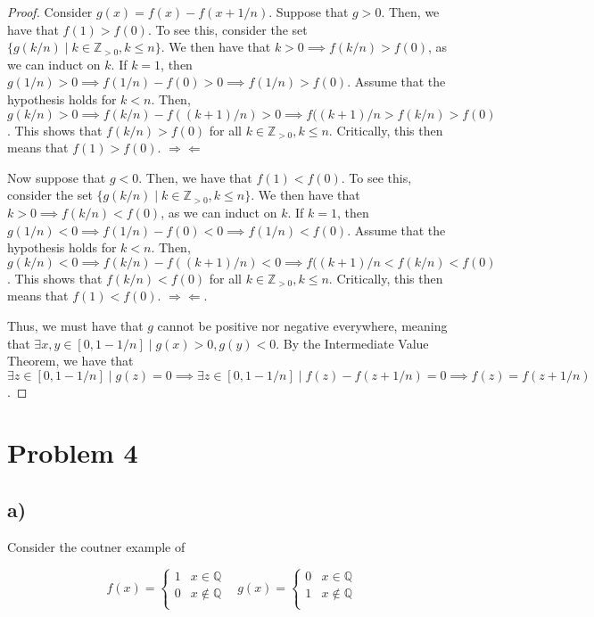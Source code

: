 \documentclass[12pt,letterpaper]{article}
\theoremstyle{definition}
\newcommand{\contra}{\Rightarrow\!\Leftarrow}
\newcommand{\Zg}{\mathbb{Z}_{>0}}
\newcommand{\Q}{\mathbb{Q}}
\begin{document}
\begin{proof}
  Consider $g(x) = f(x) - f(x + 1/n)$. Suppose that $g > 0$. Then, we have that
  $f(1) > f(0)$. To see this, consider the set $\{ g(k/n) \mid k \in \Zg, k \leq
  n\}.$ We then have that $k > 0 \implies f(k/n) > f(0)$, as we can induct on
  $k$. If $k = 1$, then $g(1/n) > 0 \implies f(1/n) - f(0) > 0 \implies f(1/n) >
  f(0)$. Assume that the hypothesis holds for $k < n$. Then, $g(k/n) > 0
  \implies f(k/n) - f((k+1)/n) > 0 \implies f((k+1)/n > f(k/n) > f(0)$. This
  shows that $f(k/n) > f(0)$ for all $k \in \Zg, k \leq n$. Critically, this
  then means that $f(1) > f(0)$. $\contra$

  Now suppose that $g < 0$. Then, we have that
  $f(1) < f(0)$. To see this, consider the set $\{ g(k/n) \mid k \in \Zg, k \leq
  n\}.$ We then have that $k > 0 \implies f(k/n) < f(0)$, as we can induct on
  $k$. If $k = 1$, then $g(1/n) < 0 \implies f(1/n) - f(0) < 0 \implies f(1/n) <
  f(0)$. Assume that the hypothesis holds for $k < n$. Then, $g(k/n) < 0
  \implies f(k/n) - f((k+1)/n) < 0 \implies f((k+1)/n < f(k/n) < f(0)$. This
  shows that $f(k/n) < f(0)$ for all $k \in \Zg, k \leq n$. Critically, this
  then means that $f(1) < f(0)$. $\contra$.

  Thus, we must have that $g$ cannot be positive nor negative everywhere,
  meaning that $\exists x,y \in [0, 1-1/n] \mid g(x) > 0, g(y) < 0$. By the
  Intermediate Value Theorem, we have that $\exists z \in [0, 1-1/n] \mid g(z) =
  0 \implies \exists z \in [0,1-1/n] \mid f(z) - f(z + 1/n) = 0 \implies f(z) =
  f(z + 1/n)$.
\end{proof}

\section*{Problem 4}

\subsection*{a)}

Consider the coutner example of

\[
  f(x) = \begin{cases}
    1 & x \in \Q \\
    0 & x \notin \Q \\
  \end{cases}
  \ \ \ \ 
  g(x) = \begin{cases}
    0 & x \in \Q \\
    1 & x \notin \Q \\
  \end{cases}
\]
\end{document}
